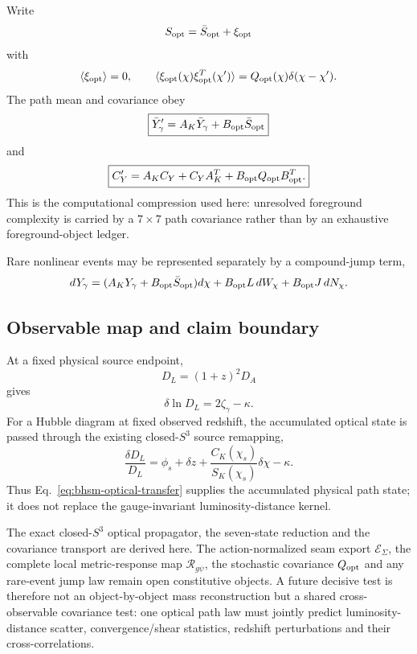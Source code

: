 Write
\begin{equation}
S_{\rm opt}
=
\bar S_{\rm opt}
+
\xi_{\rm opt}
\end{equation}
with
\begin{equation}
\langle\xi_{\rm opt}\rangle=0,
\qquad
\langle
\xi_{\rm opt}(\chi)
\xi_{\rm opt}^T(\chi')
\rangle
=
Q_{\rm opt}(\chi)\delta(\chi-\chi').
\end{equation}
The path mean and covariance obey
\begin{align}
\boxed{
\bar Y_\gamma'
=
A_K\bar Y_\gamma
+
B_{\rm opt}\bar S_{\rm opt}
}
\label{eq:bhsm-optical-mean}
\end{align}
and
\begin{equation}
\boxed{
C_Y'
=
A_KC_Y
+
C_YA_K^T
+
B_{\rm opt}Q_{\rm opt}B_{\rm opt}^T.
}
\label{eq:bhsm-optical-covariance}
\end{equation}
This is the computational compression used here: unresolved foreground
complexity is carried by a $7\times7$ path covariance rather than by an
exhaustive foreground-object ledger.

Rare nonlinear events may be represented separately by a compound-jump term,
\begin{equation}
dY_\gamma
=
(A_KY_\gamma+B_{\rm opt}\bar S_{\rm opt})d\chi
+
B_{\rm opt}L\,dW_\chi
+
B_{\rm opt}J\,dN_\chi.
\end{equation}

\subsection{Observable map and claim boundary}

At a fixed physical source endpoint,
\begin{equation}
D_L=(1+z)^2D_A
\end{equation}
gives
\begin{equation}
\delta\ln D_L
=
2\zeta_\gamma-\kappa.
\end{equation}
For a Hubble diagram at fixed observed redshift, the accumulated optical
state is passed through the existing closed-$S^3$ source remapping,
\begin{equation}
\frac{\delta D_L}{D_L}
=
\phi_s+\delta z
+
\frac{C_K(\chi_s)}{S_K(\chi_s)}\delta\chi
-\kappa.
\end{equation}
Thus Eq.~\eqref{eq:bhsm-optical-transfer} supplies the accumulated physical
path state; it does not replace the gauge-invariant luminosity-distance
kernel.

The exact closed-$S^3$ optical propagator, the seven-state reduction and the
covariance transport are derived here.  The action-normalized seam export
$\mathcal E_\Sigma$, the complete local metric-response map
$\mathcal R_{g\psi}$, the stochastic covariance $Q_{\rm opt}$ and any
rare-event jump law remain open constitutive objects.  A future decisive test
is therefore not an object-by-object mass reconstruction but a shared
cross-observable covariance test: one optical path law must jointly predict
luminosity-distance scatter, convergence/shear statistics, redshift
perturbations and their cross-correlations.
